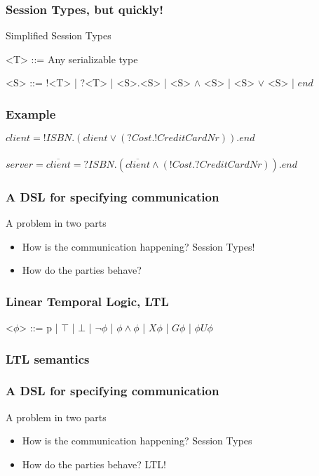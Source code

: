 \documentclass{beamer}
\begin{document}
\begin{frame}[fragile]
    \frametitle{Session Types, but quickly!}
    \large{Simplified Session Types}
    \\
    \begin{grammar}
        <T> ::= Any serializable type

        <S> ::= !<T> | ?<T> | <S>.<S> | <S> $\wedge$ <S> | <S> $\vee$ <S> | $end$
    \end{grammar}
\end{frame}

\begin{frame}[fragile]
    \frametitle{Example}
    \Large{$client = !ISBN.(client \vee (?Cost.!CreditCardNr)).end$}
    \\~\\
    \large{$server = \overline{client} = ?ISBN.(\overline{client} \wedge (!Cost.?CreditCardNr)).end$}
\end{frame}

\begin{frame}
    \frametitle{A DSL for specifying communication}
    \centering
    \Large{A problem in two parts}
    \begin{itemize}
        \item How is the communication happening? Session Types!
        \item How do the parties behave?
    \end{itemize}
\end{frame}

\begin{frame}[fragile]
    \frametitle{Linear Temporal Logic, LTL}
    \begin{grammar}
        <$\phi$> ::= p | $\top$ | $\bot$ | $\neg$$\phi$ | $\phi\wedge\phi$ | $X\phi$ | $G\phi$ | $\phi U \phi$ 
    \end{grammar}
\end{frame}

\begin{frame}[fragile]
    \frametitle{LTL semantics}
\end{frame}

\begin{frame}
    \frametitle{A DSL for specifying communication}
    \centering
    \Large{A problem in two parts}
    \begin{itemize}
        \item How is the communication happening? Session Types
        \item How do the parties behave? LTL!
    \end{itemize}
\end{frame}
\end{document}
